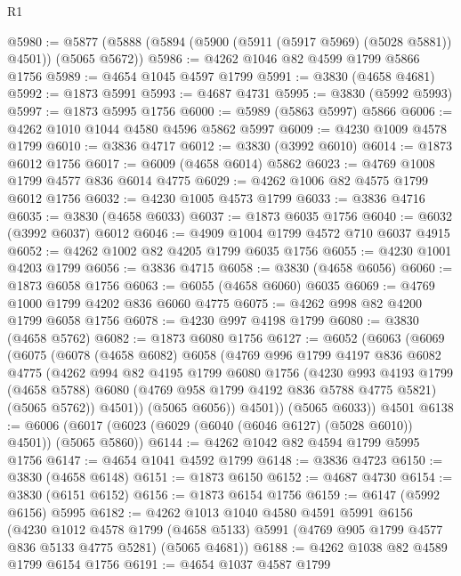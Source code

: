 \begin{lexlean}{R1}
\begin{coremodule}
@5980 := @5877 (@5888 (@5894 (@5900 (@5911 (@5917 @5969) (@5028 @5881)) @4501)) (@5065 @5672))
@5986 := @4262 @1046 @82 @4599 @1799 @5866 @1756
@5989 := @4654 @1045 @4597 @1799
@5991 := @3830 (@4658 @4681)
@5992 := @1873 @5991
@5993 := @4687 @4731
@5995 := @3830 (@5992 @5993)
@5997 := @1873 @5995 @1756
@6000 := @5989 (@5863 @5997) @5866
@6006 := @4262 @1010 @1044 @4580 @4596 @5862 @5997
@6009 := @4230 @1009 @4578 @1799
@6010 := @3836 @4717
@6012 := @3830 (@3992 @6010)
@6014 := @1873 @6012 @1756
@6017 := @6009 (@4658 @6014) @5862
@6023 := @4769 @1008 @1799 @4577 @836 @6014 @4775
@6029 := @4262 @1006 @82 @4575 @1799 @6012 @1756
@6032 := @4230 @1005 @4573 @1799
@6033 := @3836 @4716
@6035 := @3830 (@4658 @6033)
@6037 := @1873 @6035 @1756
@6040 := @6032 (@3992 @6037) @6012
@6046 := @4909 @1004 @1799 @4572 @710 @6037 @4915
@6052 := @4262 @1002 @82 @4205 @1799 @6035 @1756
@6055 := @4230 @1001 @4203 @1799
@6056 := @3836 @4715
@6058 := @3830 (@4658 @6056)
@6060 := @1873 @6058 @1756
@6063 := @6055 (@4658 @6060) @6035
@6069 := @4769 @1000 @1799 @4202 @836 @6060 @4775
@6075 := @4262 @998 @82 @4200 @1799 @6058 @1756
@6078 := @4230 @997 @4198 @1799
@6080 := @3830 (@4658 @5762)
@6082 := @1873 @6080 @1756
@6127 := @6052
    (@6063
      (@6069
        (@6075
          (@6078
            (@4658 @6082)
            @6058
            (@4769
              @996
              @1799
              @4197
              @836
              @6082
              @4775
              (@4262
                @994
                @82
                @4195
                @1799
                @6080
                @1756
                (@4230
                  @993
                  @4193
                  @1799
                  (@4658 @5788)
                  @6080
                  (@4769 @958 @1799 @4192 @836 @5788 @4775 @5821)
                  (@5065 @5762))
                @4501))
            (@5065 @6056))
          @4501))
      (@5065 @6033))
    @4501
@6138 := @6006 (@6017 (@6023 (@6029 (@6040 (@6046 @6127) (@5028 @6010)) @4501)) (@5065 @5860))
@6144 := @4262 @1042 @82 @4594 @1799 @5995 @1756
@6147 := @4654 @1041 @4592 @1799
@6148 := @3836 @4723
@6150 := @3830 (@4658 @6148)
@6151 := @1873 @6150
@6152 := @4687 @4730
@6154 := @3830 (@6151 @6152)
@6156 := @1873 @6154 @1756
@6159 := @6147 (@5992 @6156) @5995
@6182 := @4262
    @1013
    @1040
    @4580
    @4591
    @5991
    @6156
    (@4230
      @1012
      @4578
      @1799
      (@4658 @5133)
      @5991
      (@4769 @905 @1799 @4577 @836 @5133 @4775 @5281)
      (@5065 @4681))
@6188 := @4262 @1038 @82 @4589 @1799 @6154 @1756
@6191 := @4654 @1037 @4587 @1799

\end{coremodule}
\end{lexlean}
